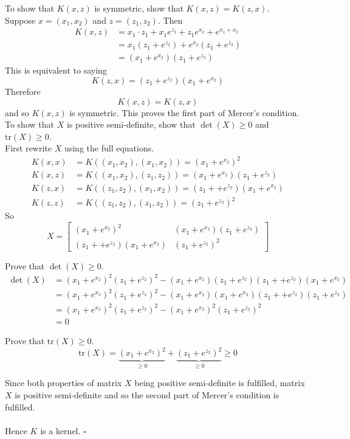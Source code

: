 \documentclass[12pt]{article}
\begin{document}
To show that $K(x,z)$ is symmetric, show that $K(x,z) = K(z,x)$.  \\
Suppose $x = (x_1,x_2)$ and $z = (z_1,z_2)$. Then 
$$ \begin{aligned} K(x,z) &= x_1 \cdot z_1 + x_1e^{z_2} + z_1e^{x_2} + e^{x_1 + x_2} \\ &= x_1(z_1 + e^{z_2}) + e^{x_2}(z_1 + e^{z_2}) \\ &= (x_1 + e^{x_2})(z_1 + e^{z_2}) \end{aligned} $$ This is equivalent to saying $$ K(z,x) = (z_1 + e^{z_2})(x_1 + e^{x_2}) $$ Therefore $$K(x,z) = K(z,x) $$ and so $K(x,z)$ is symmetric. This proves the first part of Mercer's condition. \\

To show that $X$ is positive semi-definite, show that $\det(X) \geq 0$ and $\text{tr}(X) \geq 0$. \\
First rewrite $X$ using the full equations. 
$$ \begin{aligned} 
K(x,x) &= K((x_1,x_2), (x_1,x_2)) = (x_1 + e^{x_2})^2 \\ 
K(x,z) &= K((x_1,x_2), (z_1,z_2)) = (x_1 + e^{x_2})(z_1 + e^{z_2}) \\ 
K(z,x) &= K((z_1,z_2),(x_1,x_2)) = (z_1 + + e^{z_2})(x_1 + e^{x_2}) \\
K(z,z) &= K((z_1,z_2),(z_1,z_2)) = (z_1 + e^{z_2})^2 \end{aligned} $$ 
So $$X = \begin{bmatrix}  (x_1 + e^{x_2})^2 & (x_1 + e^{x_2})(z_1 + e^{z_2}) \\ (z_1 + + e^{z_2})(x_1 + e^{x_2}) & (z_1 + e^{z_2})^2 \end{bmatrix} $$ 

Prove that $\det(X) \geq 0$. 
$$ \begin{aligned} \det(X) &= (x_1 + e^{x_2})^2(z_1 + e^{z_2})^2 - (x_1 + e^{x_2})(z_1 + e^{z_2})(z_1 + + e^{z_2})(x_1 + e^{x_2}) \\ &= (x_1 + e^{x_2})^2(z_1 + e^{z_2})^2 -  (x_1 + e^{x_2})(x_1 + e^{x_2})(z_1 + + e^{z_2})(z_1 + e^{z_2}) \\ &= (x_1 + e^{x_2})^2(z_1 + e^{z_2})^2 - (x_1 + e^{x_2})^2(z_1 + e^{z_2})^2 \\ &= 0 \end{aligned} $$ 

Prove that $\text{tr}(X) \geq 0$. 
$$ \text{tr}(X) = \underbrace{(x_1 + e^{x_2})^2}_{\geq 0} + \underbrace{(z_1 + e^{z_2})^2}_{\geq 0} \geq 0 $$ 

Since both properties of matrix $X$ being positive semi-definite is fulfilled, matrix $X$ is positive semi-definite and so the second part of Mercer's condition is fulfilled. \\~\\ Hence $K$ is a kernel. $\square$
\end{document}
